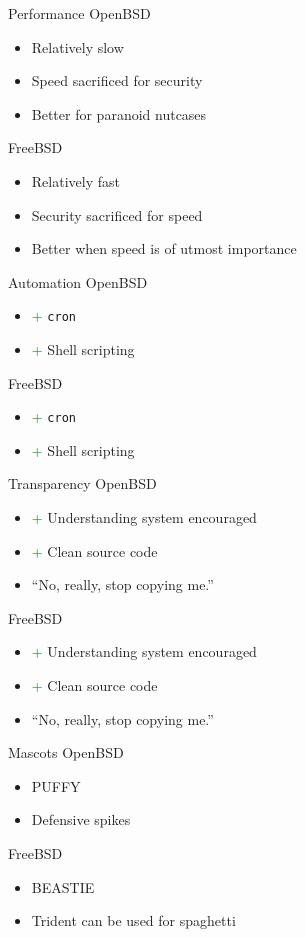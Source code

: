 \documentclass{beamer}
\newcommand{\good}{\textcolor{green}{+ }}
\begin{document}
			\begin{frame}{Performance}
				OpenBSD
				\begin{itemize}
					\item Relatively slow
					\item Speed sacrificed for security
					\item Better for paranoid nutcases
				\end{itemize}
				FreeBSD
				\begin{itemize}
					\item Relatively fast
					\item Security sacrificed for speed
					\item Better when speed is of utmost importance
				\end{itemize}
			\end{frame}
			\begin{frame}{Automation}
				OpenBSD
				\begin{itemize}
					\item \good \texttt{cron}
					\item \good Shell scripting
				\end{itemize}
				FreeBSD
				\begin{itemize}
					\item \good \texttt{cron}
					\item \good Shell scripting
				\end{itemize}
			\end{frame}
			\begin{frame}{Transparency}
				OpenBSD
				\begin{itemize}
					\item \good Understanding system encouraged
					\item \good Clean source code
					\item ``No, really, stop copying me.''
				\end{itemize}
				FreeBSD
				\begin{itemize}
					\item \good Understanding system encouraged
					\item \good Clean source code
					\item ``No, really, stop copying me.''
				\end{itemize}
			\end{frame}
			\begin{frame}{Mascots}
				OpenBSD
				\begin{itemize}
					\item PUFFY
					\item Defensive spikes
				\end{itemize}
				FreeBSD
				\begin{itemize}
					\item BEASTIE
					\item Trident can be used for spaghetti
				\end{itemize}
			\end{frame}
\end{document}

